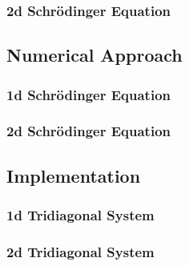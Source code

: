 \documentclass[10pt]{article}
\begin{document}
\subsubsection*{2d Schrödinger Equation}




\subsection*{Numerical Approach}

\subsubsection*{1d Schrödinger Equation}




\subsubsection*{2d Schrödinger Equation}





\subsection*{Implementation}

\subsubsection*{1d Tridiagonal System}


\subsubsection*{2d Tridiagonal System}
\end{document}
